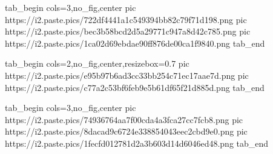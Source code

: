 \begin{itemize}
\ifcmt
  tab_begin cols=3,no_fig,center
     pic https://i2.paste.pics/722df4441a1c549394bb82c79f71d198.png
		 pic https://i2.paste.pics/bec3b58bcd2d5a29771c947a8d42c785.png
		 pic https://i2.paste.pics/1ca02d69ebdae90ff876de00ca1f9840.png
  tab_end
\fi


\ifcmt
  tab_begin cols=2,no_fig,center,resizebox=0.7
     pic https://i2.paste.pics/e95b97b6ad3cc33bb254c71ec17aae7d.png
		 pic https://i2.paste.pics/c77a2c53bf6feb9e5b61df65f21d885d.png
  tab_end
\fi

\ifcmt
  tab_begin cols=3,no_fig,center
     pic https://i2.paste.pics/74936764aa7f00cda4a3fca27cc7fcb8.png
		 pic https://i2.paste.pics/8dacad9c6724e338854043eec2cbd9e0.png
		 pic https://i2.paste.pics/1fecfd012781d2a3b603d14d6046ed48.png
  tab_end
\fi


\end{itemize} %
